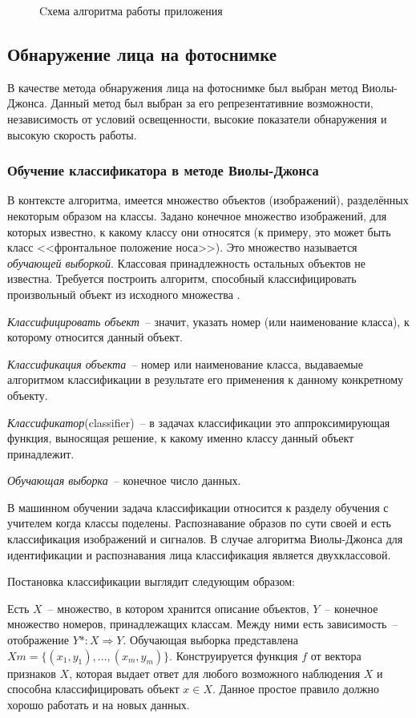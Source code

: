 \begin{figure}[p]
    \caption{Cхема алгоритма работы приложения}
    \label{fig:main_diagram}
\end{figure}

\subsection{Обнаружение лица на фотоснимке}

В качестве метода обнаружения лица на фотоснимке был выбран метод Виолы-Джонса.
Данный метод был выбран за его репрезентативние возможности, независимость от условий
освещенности, высокие показатели обнаружения и высокую скорость работы.

\subsubsection{Обучение классификатора в методе Виолы-Джонса}

В контексте алгоритма, имеется множество объектов (изображений), разделённых некоторым образом на классы. Задано конечное
множество изображений, для которых известно, к какому классу они относятся (к примеру, это может быть класс <<фронтальное положение
носа>>). Это множество называется \textit{обучающей выборкой}. Классовая принадлежность остальных объектов не известна. Требуется построить
алгоритм, способный классифицировать произвольный объект из исходного множества \cite{viola_jones}.

\textit{Классифицировать объект}~-- значит, указать номер (или наименование класса), к которому относится данный объект.

\textit{Классификация объекта}~-- номер или наименование класса, выдаваемые алгоритмом классификации в результате его применения к данному
конкретному объекту.

\textit{Классификатор}(classifier)~-- в задачах классификации это аппроксимирующая функция, выносящая решение, к какому именно классу данный
объект принадлежит.

\textit{Обучающая выборка}~-- конечное число данных.

В машинном обучении задача классификации относится к разделу обучения с учителем когда классы поделены. Распознавание образов по
сути своей и есть классификация изображений и сигналов. В случае алгоритма Виолы-Джонса для идентификации и распознавания лица
классификация является двухклассовой.

Постановка классификации выглядит следующим образом:

Есть $X$~-- множество, в котором хранится описание объектов, $Y$~-- конечное множество номеров, принадлежащих классам. Между ними есть
зависимость~-- отображение $Y*: X \Rightarrow Y$. Обучающая выборка представлена $Xm = \lbrace(x_1,y_1), \dots, (x_m,y_m)\rbrace$.
Конструируется функция $f$ от
вектора признаков $X$, которая выдает ответ для любого возможного наблюдения $X$ и способна классифицировать объект $x\in X$. Данное
простое правило должно хорошо работать и на новых данных.

